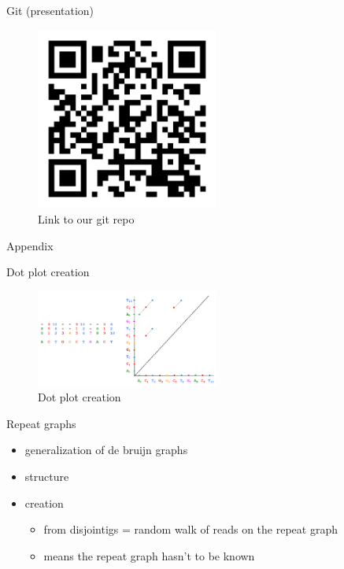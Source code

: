 \documentclass{beamer}
\begin{document}
  \begin{frame}{Git (presentation)}

    \begin{figure}
      \includegraphics[width=6cm]{images/qr-code.png}
      \caption{Link to our git repo}
      \label{fig:qr}
    \end{figure}
  
  \end{frame}

  \begin{frame}[standout]
    Appendix
  \end{frame}

  \begin{frame}{Dot plot creation}
    \begin{figure}
      \includegraphics[width=6cm]{images/dot_plot_creation.png}
      \caption{Dot plot creation}
      \label{fig:dotp_creation}
    \end{figure}
  \end{frame}

  \begin{frame}{Repeat graphs}
    \begin{itemize}[<+- | alert@+>]
      \item generalization of de bruijn graphs

      \item structure

      \item creation
      
      \begin{itemize}[<+- | alert@+>]

        \item from disjointigs = random walk of reads on the repeat graph 
      
        \item means the repeat graph hasn't to be known
      \end{itemize}
    \end{itemize}
  \end{frame}
\end{document}

